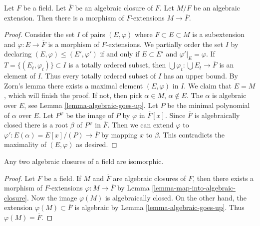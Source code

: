 \begin{lemma}
\label{lemma-map-into-algebraic-closure}
Let $F$ be a field. Let $\overline{F}$ be an algebraic closure of $F$.
Let $M/F$ be an algebraic extension. Then there is a morphism of
$F$-extensions $M \to \overline{F}$.
\end{lemma}

\begin{proof}
Consider the set $I$ of pairs $(E, \varphi)$ where $F \subset E \subset M$
is a subextension and $\varphi : E \to \overline{F}$ is a morphism of
$F$-extensions. We partially order the set $I$ by declaring
$(E, \varphi) \leq (E', \varphi')$ if and only if $E \subset E'$ and
$\varphi'|_E = \varphi$. If $T = \{(E_t,  \varphi_t)\} \subset I$
is a totally ordered subset, then
$\bigcup \varphi_t : \bigcup E_t \to \overline{F}$ is an element of $I$.
Thus every totally ordered subset of $I$ has an upper bound.
By Zorn's lemma there exists a maximal element $(E, \varphi)$ in $I$.
We claim that $E = M$, which will finish the proof. If not, then
pick $\alpha \in M$, $\alpha \not \in E$. The $\alpha$ is algebraic
over $E$, see Lemma \ref{lemma-algebraic-goes-up}.
Let $P$ be the minimal polynomial of $\alpha$ over $E$.
Let $P^\varphi$ be the image of $P$ by $\varphi$ in $\overline{F}[x]$.
Since $\overline{F}$ is algebraically closed there is a root $\beta$
of $P^\varphi$ in $\overline{F}$. Then we can extend $\varphi$ to
$\varphi' : E(\alpha) = E[x]/(P) \to \overline{F}$ by mapping
$x$ to $\beta$. This contradicts the maximality of $(E, \varphi)$
as desired.
\end{proof}

\begin{lemma}
\label{lemma-algebraic-closures-isomorphic}
Any two algebraic closures of a field are isomorphic.
\end{lemma}

\begin{proof}
Let $F$ be a field. If $M$ and $\overline{F}$ are algebraic closures of
$F$, then there exists a morphism of $F$-extensions
$\varphi : M \to \overline{F}$ by
Lemma \ref{lemma-map-into-algebraic-closure}.
Now the image $\varphi(M)$ is algebraically closed.
On the other hand, the extension $\varphi(M) \subset \overline{F}$
is algebraic by Lemma \ref{lemma-algebraic-goes-up}.
Thus $\varphi(M) = \overline{F}$.
\end{proof}





